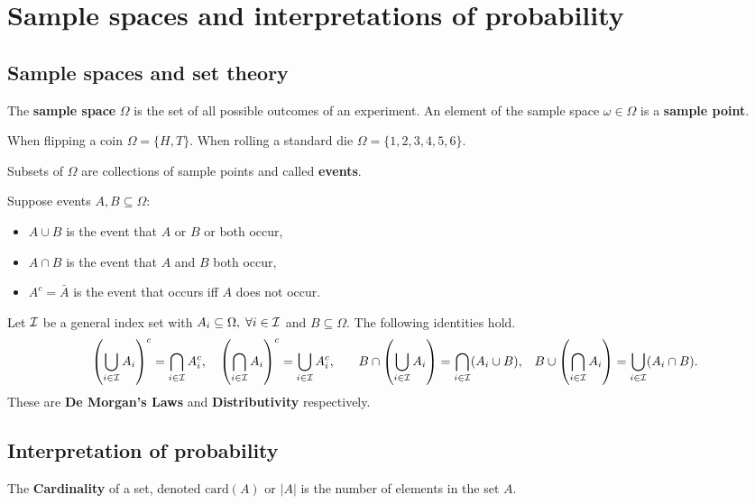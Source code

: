 \section{Sample spaces and interpretations of probability}

\subsection{Sample spaces and set theory}

\begin{definition}
    The \textbf{sample space} $\Omega$ is the set of all possible outcomes of an experiment. An element of the sample space $\omega \in \Omega$ is a \textbf{sample point}.
\end{definition}

\begin{examples}
    When flipping a coin $\Omega  = \{H,T\}$. When rolling a standard die $\Omega = \{1,2,3,4,5,6\}$.
\end{examples}

\begin{definition}
    Subsets of $\Omega$ are collections of sample points and called \textbf{events}.
\end{definition}

Suppose events $A,B\subseteq\Omega$:
\begin{itemize}
    \item $A\cup B$ is the event that $A$ or $B$ or both occur,
    \item $A\cap B$ is the event that $A$ and $B$ both occur,
    \item $A^c = \bar{A}$ is the event that occurs iff $A$ does not occur.
\end{itemize}


Let $\mathcal{I}$ be a general index set with $A_i \subseteq\Omega,\; \forall i \in\mathcal{I}$ and $B \subseteq \Omega$. The following identities hold.
\[
\left( \bigcup_{i\in\mathcal{I}}A_i \right)^c = \bigcap_{i\in\mathcal{I}}A_i^c \textcolor{black}{,} \quad
\left( \bigcap_{i\in\mathcal{I}}A_i \right)^c = \bigcup_{i\in\mathcal{I}}A_i^c \textcolor{black}{,} \qquad
B \cap \left( \bigcup_{i\in\mathcal{I}}A_i \right) = \bigcap_{i\in\mathcal{I}}(A_i\cup B) \textcolor{black}{,} \quad
B \cup \left( \bigcap_{i\in\mathcal{I}}A_i \right) = \bigcup_{i\in\mathcal{I}}(A_i\cap B) \textcolor{black}{.}
\]
These are \textbf{De Morgan's Laws} and \textbf{Distributivity} respectively.


\subsection{Interpretation of probability}
\begin{definition}
    The \textbf{Cardinality} of a set, denoted $\text{card}(A)$ or $|A|$ is the number of elements in the set $A$.
\end{definition}

